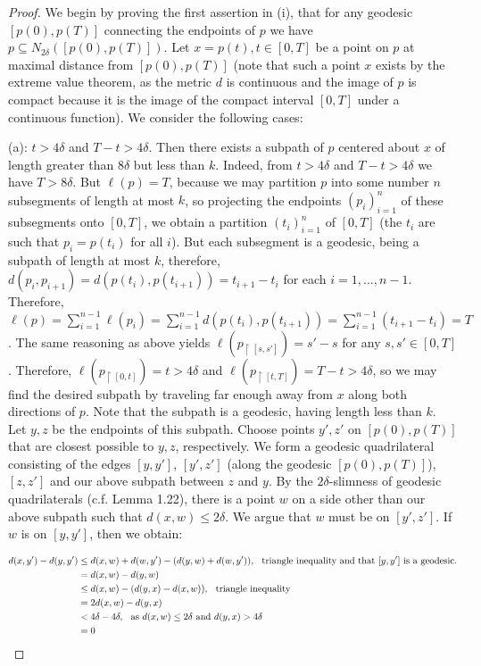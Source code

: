 \documentclass[12pt]{article}
\newcommand{\vs}{\vskip10pt}
\begin{document}
	
	\begin{proof}
		
		We begin by proving the first assertion in (i), that for any geodesic $[p(0), p(T)]$ connecting the endpoints of $p$ we have $p \subseteq N_{2 \delta}([p(0), p(T)])$. Let $x = p(t), t \in [0, T]$ be a point on $p$ at maximal distance from $[p(0), p(T)]$ (note that such a point $x$ exists by the extreme value theorem, as the metric $d$ is continuous and the image of $p$ is compact because it is the image of the compact interval $[0,T]$ under a continuous function). We consider the following cases: 
		
		\vs 
		
		(a): $t > 4 \delta$ and $T - t > 4 \delta$. Then there exists a subpath of $p$ centered about $x$ of length greater than $8 \delta$ but less than $k$. Indeed, from $t > 4 \delta$ and $T - t > 4 \delta$ we have $T > 8 \delta$. But $\ell(p) = T$, because we may partition $p$ into some number $n$ subsegments of length at most $k$, so projecting the endpoints $(p_i)_{i=1}^n$ of these subsegments onto $[0,T]$, we obtain a partition $(t_i)_{i=1}^n$ of $[0,T]$ (the $t_i$ are such that $p_i = p(t_i)$ for all $i$). But each subsegment is a geodesic, being a subpath of length at most $k$, therefore, $d(p_i, p_{i+1}) = d(p(t_i), p(t_{i+1})) = t_{i+1} - t_i$ for each $i  = 1,...,n-1$. Therefore, $\ell(p) = \sum_{i = 1}^{n-1} \ell(p_i) = \sum_{i = 1}^{n-1} d(p(t_i), p(t_{i+1})) = \sum_{i = 1}^{n-1} (t_{i+1} - t_i) = T$. The same reasoning as above yields $\ell(p_{\restriction [s, s']}) = s' - s$ for any $s,s' \in [0,T]$. Therefore, $\ell(p_{\restriction [0, t]}) = t > 4 \delta$ and $\ell(p_{\restriction [t, T]}) = T - t > 4 \delta$, so we may find the desired subpath by traveling far enough away from $x$ along both directions of $p$. Note that the subpath is a geodesic, having length less than $k$. Let $y, z$ be the endpoints of this subpath. Choose points $y', z'$ on $[p(0), p(T)]$ that are closest possible to $y,z$, respectively. We form a geodesic quadrilateral consisting of the edges $[y, y']$, $[y', z']$ (along the geodesic $[p(0), p(T)]$), $[z,z']$ and our above subpath between $z$ and $y$. By the $2 \delta$-slimness of geodesic quadrilaterals (c.f. Lemma 1.22), there is a point $w$ on a side other than our above subpath such that $d(x, w) \leq 2 \delta$. We argue that $w$ must be on $[y', z']$. If $w$ is on $[y, y']$, then we obtain: 
		
		\begin{align*}
		d(x, y') - d(y, y') &\leq d(x,w) + d(w,y') - (d(y, w) + d(w, y')), \hspace{0.25cm} \text{triangle inequality and that } [y,y'] \text{ is a geodesic}. \\
		&= d(x,w) - d(y, w) \\
		&\leq d(x,w) - (d(y,x) - d(x,w)), \hspace{0.25cm} \text{triangle inequality} \\
		&= 2d(x,w) - d(y,x) \\
		&< 4 \delta - 4 \delta, \hspace{0.25cm} \text{as } d(x,w) \leq 2\delta \text{ and } d(y,x) > 4 \delta \\
		&= 0
		\end{align*} 
		

\end{proof}
\end{document}
